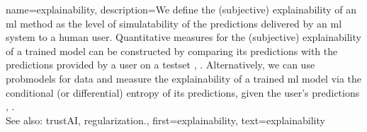 {name={explainability},
	description={We define the (subjective) explainability of an \gls{ml} method 
		as the level of simulatability \cite{Colin:2022aa} of the \glspl{prediction} 
		delivered by an \gls{ml} system to a human user. Quantitative measures for the 
		(subjective) explainability of a trained \gls{model} can be constructed by 
		comparing its \glspl{prediction} with the \glspl{prediction} provided by a user 
		on a \gls{testset} \cite{Colin:2022aa}, \cite{Zhang:2024aa}. Alternatively, we can use 
		\glspl{probmodel} for \gls{data} and measure the explainability of a trained \gls{ml} 
		\gls{model} via the conditional (or differential) \gls{entropy} of its \glspl{prediction}, given the 
		user's \glspl{prediction} \cite{JunXML2020}, \cite{Chen2018}.
						\\ 
		See also: \gls{trustAI}, \gls{regularization}.},
	first={explainability},
	text={explainability}
}

